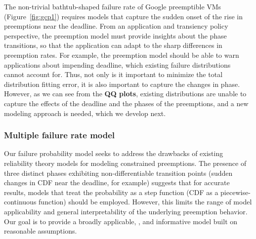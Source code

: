 

The non-trivial bathtub-shaped failure rate of Google preemptible VMs (Figure~\ref{fig:gcp1}) requires models that capture the sudden onset of the rise in preemptions near the deadline.
From an application and transiency policy perspective, the preemption model must provide insights about the phase transitions, so that the application can adapt to the sharp differences in preemption rates.
%
For example, the preemption model should be able to warn applications about impending deadline, which existing failure distributions cannot account for. 
Thus, not only is it important to minimize the total distribution fitting error, it is also important to capture the changes in phase.
However, as we can see from the \textbf{QQ plots}, existing distributions are unable to capture the effects of the deadline and the phases of the preemptions, and a new modeling approach is needed, which we develop next.  

\subsubsection{Multiple failure rate model}




Our failure probability model seeks to address the drawbacks of existing reliability theory models for modeling constrained preemptions. 
The presence of three distinct phases exhibiting non-differentiable transition points (sudden changes in CDF near the deadline, for example) suggests that for accurate results, models that treat the probability as a step function (CDF as a piecewise-continuous function) should be employed. However, this limits the range of model applicability and general interpretability of the underlying preemption behavior. Our goal is to provide a broadly applicable, , and informative model built on reasonable assumptions.  

